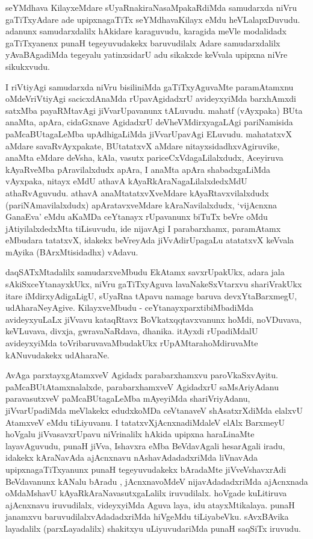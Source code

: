 \begin{artha}
 seYMdhava KilayxeMdare sUyaRnakiraNasaMpakaRdiMda samudarxda niVru
 gaTiTxyAdare ade upipxnagaTiTx seYMdhavaKilayx eMdu
 heVLalapxDuvudu. adanunx samudarxdalilx hAkidare karaguvudu, karagida
 meVle modalidadx gaTiTxyanenx punaH tegeyuvudakekx baruvudilalx
 Adare samudarxdalilx yAvaBAgadiMda tegeyalu yatinxsidarU adu
 sikakxde keVvala upipxna niVre sikukxvudu.

I riVtiyAgi samudarxda niVru bisiliniMda gaTiTxyAguvaMte  paramAtamxnu
oMdeVriVtiyAgi sacicxdAnaMda rUpavAgidadxrU avideyxyiMda barxhAmxdi
satxMba payaRMtavAgi jiVvarUpavanunx tALuvudu. mahatf (vAyxpaka) BUta
anaMta, apAra, cidaGxnave AgidadxrU deVheVMdirxyagaLAgi pariNamisida
paMcaBUtagaLeMba upAdhigaLiMda jiVvarUpavAgi ELuvudu. mahatatxvX aMdare
savaRvAyxpakate, BUtatatxvX aMdare nitayxsidadhxvAgiruvike, anaMta
eMdare deVsha, kAla, vasutx pariceCxVdagaLilalxdudx, Aceyiruva
kAyaRveMba pAravilalxdudx apAra, I anaMta apAra shabadxgaLiMda
vAyxpaka, nitayx eMdU athavA kAyaRkAraNagaLilalxdedxMdU athaRvAguvudu.
athavA anaMtatatxvXveMdare kAyaRtavxvilalxdudx (pariNAmavilalxdudx)
apAratavxveMdare kAraNavilalxdudx, `vijAcnxna GanaEva' eMdu aKaMDa ceYtanayx
rUpavanunx biTuTx beVre oMdu jAtiyilalxdedxMta tiLisuvudu, ide
nijavAgi I parabarxhamx, paramAtamx eMbudara tatatxvX, idakekx beVreyAda
jiVvAdirUpagaLu atatatxvX keVvala mAyika (BArxMtisidadhx) vAdavu. 

daqSATxMtadalilx samudarxveMbudu EkAtamx savxrUpakUkx, adara jala
sAkiSxceYtanayxkUkx, niVru gaTiTxyAguva lavaNakeSxVtarxvu shariVrakUkx
itare iMdirxyAdigaLigU, sUyaRna tApavu namage baruva devxYtaBarxmegU,
udAharaNeyAgive. KilayxveMbudu - ceYtanayxparxtibiMbadiMda avideyxyuLaLx
jiVvavu kataqRtavx BoVkatxqqtavxvanunx hoMdi,  noVDuvava, keVLuvava,
divxja, gwravaNaRdava, dhanika. itAyxdi rUpadiMdalU avideyxyiMda
toVribaruvavaMbudakUkx rUpAMtarahoMdiruvaMte kANuvudakekx udAharaNe.

AvAga parxtayxgAtamxveV Agidadx parabarxhamxvu
paroVkaSxvAyitu. paMcaBUtAtamxnalalxde, parabarxhamxveV AgidadxrU
saMsAriyAdanu paravasutxveV paMcaBUtagaLeMba mAyeyiMda shariVriyAdanu,
jiVvarUpadiMda meVlakekx edudxkoMDa ceVtanaveV shAsatxrXdiMda elalxvU AtamxveV
eMdu tiLiyuvanu. I tatatxvXjAcnxnadiMdaleV elAlx BarxmeyU hoVgalu
jiVvasavxrUpavu niVrinalilx hAkida upipxna haraLinaMte layavAguvudu,
punaH jiVva, Ishavxra eMba BeVdavAgali hesarAgali iradu, idakekx
kAraNavAda ajAcnxnavu nAshavAdadadxriMda liVnavAda
upipxnagaTiTxyanunx punaH tegeyuvudakekx bAradaMte jiVveVshavxrAdi
BeVdavanunx kANalu bAradu , jAcnxnavoMdeV nijavAdadadxriMda
ajAcnxnada oMdaMshavU kAyaRkAraNavasutxgaLalilx
iruvudilalx. hoVgade kuLitiruva ajAcnxnavu iruvudilalx, videyxyiMda
Aguva laya, idu atayxMtikalaya. punaH janamxvu baruvudilalxvAdadadxriMda
hiVgeMdu tiLiyabeVku. sAvxBAvika layadalilx (parxLayadalilx) shakitxyu
uLiyuvudariMda punaH saqSiTx iruvudu.
\end{artha}


